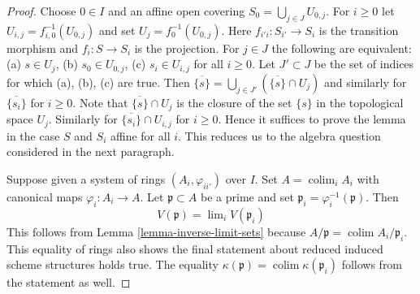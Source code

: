 \documentclass[10pt,a4paper]{amsart}
\theoremstyle{plain}
\theoremstyle{definition}
\theoremstyle{remark}
\numberwithin{equation}{subsection}
\def\lim{\mathop{\mathrm{lim}}\nolimits}
\def\colim{\mathop{\mathrm{colim}}\nolimits}
\begin{document}
\begin{proof}
Choose $0 \in I$ and an affine open covering
$S_0 = \bigcup_{j \in J} U_{0, j}$.
For $i \geq 0$ let $U_{i, j} = f_{i, 0}^{-1}(U_{0, j})$
and set $U_j = f_0^{-1}(U_{0, j})$.
Here $f_{i'i} : S_{i'} \to S_i$ is the transition morphism
and $f_i : S \to S_i$ is the projection.
For $j \in J$ the following are equivalent:
(a) $s \in U_j$, (b) $s_0 \in U_{0, j}$,
(c) $s_i \in U_{i, j}$ for all $i \geq 0$.
Let $J' \subset J$ be the set of indices for which (a), (b), (c) are true.
Then $\overline{\{s\}} = \bigcup_{j \in J'} (\overline{\{s\}} \cap U_j)$
and similarly for $\overline{\{s_i\}}$ for $i \geq 0$.
Note that $\overline{\{s\}} \cap U_j$ is the closure of the
set $\{s\}$ in the topological space $U_j$. Similarly for
$\overline{\{s_i\}} \cap U_{i, j}$ for $i \geq 0$.
Hence it suffices to prove the lemma in the case
$S$ and $S_i$ affine for all $i$. This reduces us to the
algebra question considered in the next paragraph.

\medskip\noindent
Suppose given a system of rings $(A_i, \varphi_{ii'})$
over $I$. Set $A = \colim_i A_i$ with canonical maps
$\varphi_i : A_i \to A$. Let $\mathfrak p \subset A$ be a
prime and set $\mathfrak p_i = \varphi_i^{-1}(\mathfrak p)$.
Then
$$
V(\mathfrak p) = \lim_i V(\mathfrak p_i)
$$
This follows from Lemma \ref{lemma-inverse-limit-sets}
because $A/\mathfrak p = \colim A_i/\mathfrak p_i$.
This equality of rings also shows the final statement
about reduced induced scheme structures holds true.
The equality $\kappa(\mathfrak p) = \colim \kappa(\mathfrak p_i)$
follows from the statement as well.
\end{proof}
\end{document}
